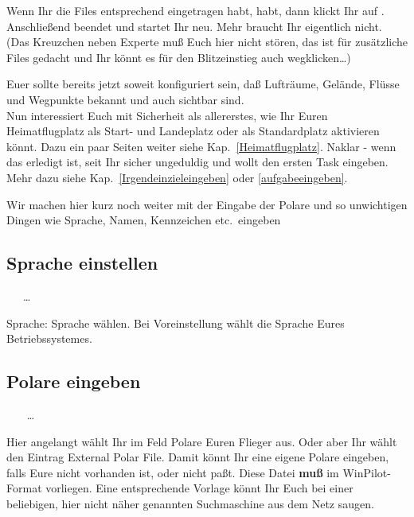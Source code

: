  Wenn Ihr die Files entsprechend eingetragen habt, habt, dann klickt Ihr auf .
  Anschließend beendet und startet Ihr \xc neu. Mehr braucht Ihr eigentlich nicht. (Das Kreuzchen neben Experte muß Euch hier nicht stören, das ist für zusätzliche Files gedacht und Ihr könnt es für den Blitzeinstieg auch wegklicken\dots )

Euer \xc sollte bereits jetzt soweit konfiguriert sein, daß Lufträume, Gelände, Flüsse und Wegpunkte bekannt und auch sichtbar sind.\\

Nun interessiert Euch mit Sicherheit als allererstes, wie Ihr Euren Heimatflugplatz als Start- und Landeplatz oder als Standardplatz aktivieren könnt. Dazu ein paar Seiten weiter siehe Kap.\ \ref{Heimatflugplatz}. Naklar - wenn das erledigt ist, seit Ihr sicher ungeduldig und wollt den ersten Task eingeben.
Mehr dazu siehe Kap.\ \ref{Irgendeinzieleingeben} oder \ref{aufgabeeingeben}.

Wir machen hier kurz noch weiter mit der Eingabe der Polare und so unwichtigen Dingen wie Sprache, Namen, Kennzeichen etc.\  eingeben

\subsection{Sprache einstellen}\label{Spracheeingeben}
\begin{center}
 \blink~\blink~\blink~\far \far\dots{}
 \end{center}

 \textsf{Sprache}: Sprache wählen. Bei \textsf{Voreinstellung} wählt  \xc die  Sprache Eures Betriebssystemes.
 \stop

\subsection{Polare eingeben}
\begin{center}
\blink~\blink~\blink~ \far \far \dots \qquad {}
\end{center}
Hier angelangt wählt Ihr im Feld \textsf{Polare} Euren Flieger aus. Oder aber Ihr wählt den
Eintrag \textsf{External Polar File}. Damit könnt Ihr eine eigene Polare eingeben, falls Eure nicht vorhanden ist, oder nicht paßt. Diese Datei \textbf{muß} im \textsf{WinPilot}-Format vorliegen.
Eine entsprechende Vorlage könnt Ihr Euch bei einer beliebigen, hier nicht näher genannten Suchmaschine aus dem Netz saugen.

